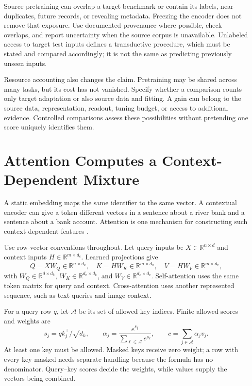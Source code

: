 Source pretraining can overlap a target benchmark or contain its labels, near-duplicates, future records, or revealing metadata. Freezing the encoder does not remove that exposure. Use documented provenance where possible, check overlaps, and report uncertainty when the source corpus is unavailable. Unlabeled access to target test inputs defines a transductive procedure, which must be stated and compared accordingly; it is not the same as predicting previously unseen inputs.

Resource accounting also changes the claim. Pretraining may be shared across many tasks, but its cost has not vanished. Specify whether a comparison counts only target adaptation or also source data and fitting. A gain can belong to the source data, representation, readout, tuning budget, or access to additional evidence. Controlled comparisons assess these possibilities without pretending one score uniquely identifies them.

\section{Attention Computes a Context-Dependent Mixture}

A static embedding maps the same identifier to the same vector. A contextual encoder can give a token different vectors in a sentence about a river bank and a sentence about a bank account. Attention is one mechanism for constructing such context-dependent features \citep{vaswani2017}.

Use row-vector conventions throughout. Let query inputs be $X\in\mathbb R^{n\times d}$ and context inputs $H\in\mathbb R^{m\times d_c}$. Learned projections give
\[
Q=XW_Q\in\mathbb R^{n\times d_k},\quad
K=HW_K\in\mathbb R^{m\times d_k},\quad
V=HW_V\in\mathbb R^{m\times d_v},
\]
with $W_Q\in\mathbb R^{d\times d_k}$, $W_K\in\mathbb R^{d_c\times d_k}$, and $W_V\in\mathbb R^{d_c\times d_v}$. Self-attention uses the same token matrix for query and context. Cross-attention uses another represented sequence, such as text queries and image context.

For a query row $q$, let $\mathcal A$ be its set of allowed key indices. Finite allowed scores and weights are
\[
s_j=qk_j^\top/\sqrt{d_k},\qquad
\alpha_j=\frac{e^{s_j}}{\sum_{\ell\in\mathcal A}e^{s_\ell}},
\qquad c=\sum_{j\in\mathcal A}\alpha_jv_j.
\]
At least one key must be allowed. Masked keys receive zero weight; a row with every key masked needs separate handling because the formula has no denominator. Query--key scores decide the weights, while values supply the vectors being combined.


